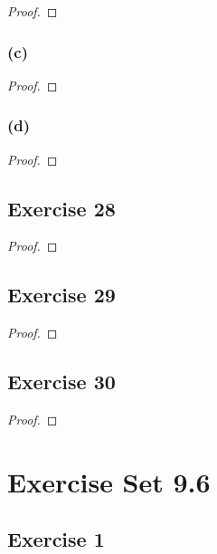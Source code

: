 \documentclass[14pt]{extarticle}
\begin{document}
\begin{proof}

\end{proof}

\subsubsection{(c)}

\begin{proof}

\end{proof}

\subsubsection{(d)}

\begin{proof}

\end{proof}

\subsection{Exercise 28}

\begin{proof}

\end{proof}

\subsection{Exercise 29}

\begin{proof}

\end{proof}

\subsection{Exercise 30}

\begin{proof}

\end{proof}

\section{Exercise Set 9.6}

\subsection{Exercise 1}
\end{document}
